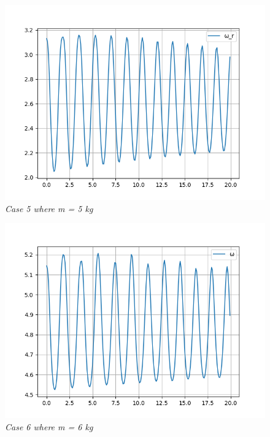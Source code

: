        \begin{figure}[H]
            \centering
            \includegraphics{Appendix/RExpPictures/F/fm5.png}
            \caption{\textit{Case 5 where m = 5 kg}}
            \label{}
        \end{figure}
            
        \begin{figure}[H]
            \centering
            \includegraphics{Appendix/RExpPictures/AF/afm6.png}
            \caption{\textit{Case 6 where m = 6 kg}}
            \label{}
        \end{figure}
            
